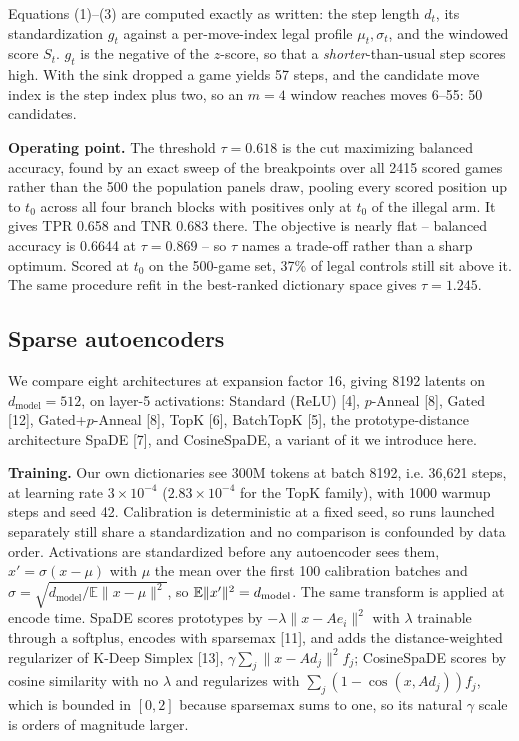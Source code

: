 Equations (1)--(3) are computed exactly as written: the step length $d_t$, its standardization
$g_t$ against a per-move-index legal profile $\mu_t, \sigma_t$, and the windowed score $S_t$.
$g_t$ is the negative of the $z$-score, so that a \emph{shorter}-than-usual step scores high. With
the sink dropped a game yields 57 steps, and the candidate move index is the step index plus two,
so an $m = 4$ window reaches moves 6--55: 50 candidates.

\textbf{Operating point.} The threshold $\tau = 0.618$ is the cut maximizing balanced accuracy,
found by an exact sweep of the breakpoints over all 2415 scored games rather than the 500 the
population panels draw, pooling every
scored position up to $t_0$ across all four branch blocks with positives only at $t_0$ of the
illegal arm. It gives TPR 0.658 and TNR 0.683 there. The objective is nearly flat -- balanced accuracy is
0.6644 at $\tau = 0.869$ -- so $\tau$ names a trade-off rather than a sharp optimum. Scored at
$t_0$ on the 500-game set, 37\% of legal controls still sit above it. The same procedure refit in the best-ranked dictionary space
gives $\tau = 1.245$.

\subsection{Sparse autoencoders}

We compare eight architectures at expansion factor 16, giving 8192 latents on
$d_{\mathrm{model}} = 512$, on layer-5 activations: Standard (ReLU) [4], $p$-Anneal [8], Gated [12],
Gated+$p$-Anneal [8], TopK [6], BatchTopK [5], the prototype-distance architecture SpaDE [7],
and CosineSpaDE, a variant of it we introduce here.

\textbf{Training.} Our own dictionaries see 300M tokens at batch 8192, i.e. 36,621 steps, at
learning rate $3\times10^{-4}$ ($2.83\times10^{-4}$ for the TopK family), with 1000 warmup steps
and seed 42. Calibration is deterministic at a fixed seed, so runs launched separately still
share a standardization and no comparison is confounded by data order. Activations are standardized before any autoencoder sees
them, $x' = \sigma (x - \mu)$ with $\mu$ the mean over the first 100 calibration batches and
$\sigma = \sqrt{d_{\mathrm{model}} / \mathbb{E}\|x - \mu\|^2}$, so $\mathbb{E}\|x'\|^2 = d_{\rm
model}$. The same transform is applied at encode time. SpaDE scores prototypes by
$-\lambda\|x - Ae_i\|^2$ with $\lambda$ trainable through a softplus, encodes with sparsemax [11],
and adds the distance-weighted regularizer of K-Deep Simplex [13],
$\gamma \sum_j \|x - Ad_j\|^2 f_j$; CosineSpaDE scores
by cosine similarity with no $\lambda$ and regularizes with $\sum_j (1 - \cos(x, Ad_j)) f_j$,
which is bounded in $[0, 2]$ because sparsemax sums to one, so its natural $\gamma$ scale is
orders of magnitude larger.

